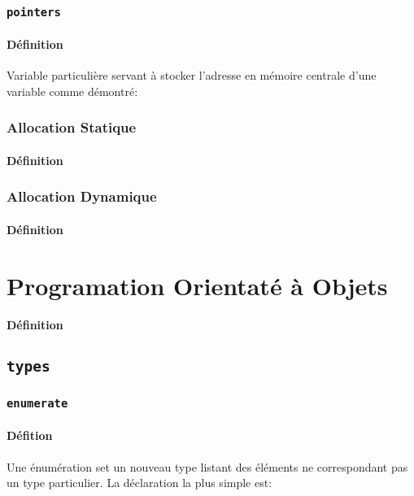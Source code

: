 \documentclass{article}
\begin{document}
\subsubsection{\texttt{pointers}}
\paragraph{Définition}Variable particulière servant à stocker l'adresse en mémoire centrale d'une variable comme démontré:
\begin{scriptsize}
    \mycode
\end{scriptsize}

\subsubsection{Allocation Statique}
\paragraph{Définition}

\subsubsection{Allocation Dynamique}
\paragraph{Définition}


\section{Programation Orientaté à Objets}
\paragraph{Définition}

\subsection{\texttt{types}}
\subsubsection{\texttt{enumerate}}
\paragraph{Défition}Une énumération set un nouveau type listant des éléments ne correspondant pas un type particulier. La déclaration la plus simple est:
\begin{scriptsize}
    \mycode
\end{scriptsize}
\end{document}
